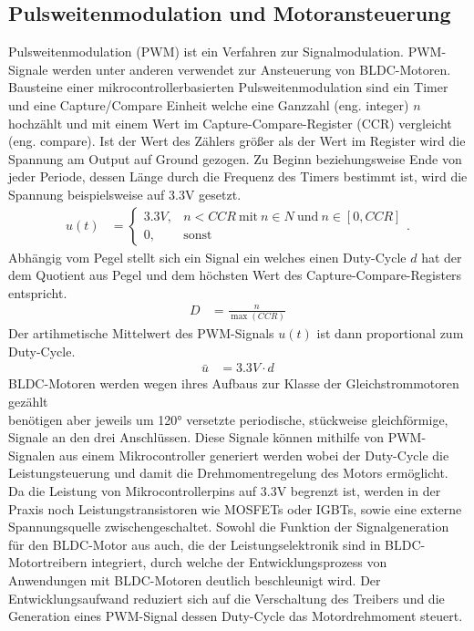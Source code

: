 \subsection{Pulsweitenmodulation und Motoransteuerung}
Pulsweitenmodulation (PWM) ist ein Verfahren zur Signalmodulation. PWM-Signale werden unter anderen verwendet zur Ansteuerung von BLDC-Motoren.\\
Bausteine einer mikrocontrollerbasierten Pulsweitenmodulation sind ein Timer und eine Capture/Compare Einheit welche eine Ganzzahl (eng. integer) $n$ hochzählt und mit einem Wert im Capture-Compare-Register (CCR) vergleicht (eng. compare). Ist der Wert des Zählers größer als der Wert im Register wird die Spannung am Output auf Ground gezogen. Zu Beginn beziehungsweise Ende von jeder Periode, dessen Länge durch die Frequenz des Timers bestimmt ist, wird die Spannung beispielsweise auf 3.3V gesetzt. 
\begin{align}
	u(t) &= \left\{\begin{array}{ll} 3.3V, & n < CCR\ \text{mit}\ n\in N\ \text{und}\ n\in [0, CCR]\\
		0, &\text{sonst}\end{array}\right. .
\end{align}
Abhängig vom Pegel stellt sich ein Signal ein welches einen Duty-Cycle $d$ hat der dem Quotient aus Pegel und dem höchsten Wert des Capture-Compare-Registers entspricht. 
\begin{align}
	D &= \frac{n}{\max{(CCR)}}
\end{align}
Der artihmetische Mittelwert des PWM-Signals $u(t)$ ist dann proportional zum Duty-Cycle.
\begin{align}
	\bar{u} &= 3.3V\cdot d
\end{align}
BLDC-Motoren werden wegen ihres Aufbaus zur Klasse der Gleichstrommotoren gezählt\\ benötigen aber jeweils um 120° versetzte periodische, stückweise gleichförmige, Signale an den drei Anschlüssen. Diese Signale können mithilfe von PWM-Signalen aus einem Mikrocontroller generiert werden wobei der Duty-Cycle die Leistungsteuerung und damit die Drehmomentregelung des Motors ermöglicht. Da die Leistung von Mikrocontrollerpins auf 3.3V begrenzt ist, werden in der Praxis noch Leistungstransistoren wie MOSFETs oder IGBTs, sowie eine externe Spannungsquelle zwischengeschaltet. Sowohl die Funktion der Signalgeneration für den BLDC-Motor aus auch, die der Leistungselektronik sind in BLDC-Motortreibern integriert, durch welche der Entwicklungsprozess von Anwendungen mit BLDC-Motoren deutlich beschleunigt wird. Der Entwicklungsaufwand reduziert sich auf die Verschaltung des Treibers und die Generation eines PWM-Signal dessen Duty-Cycle das Motordrehmoment steuert.


